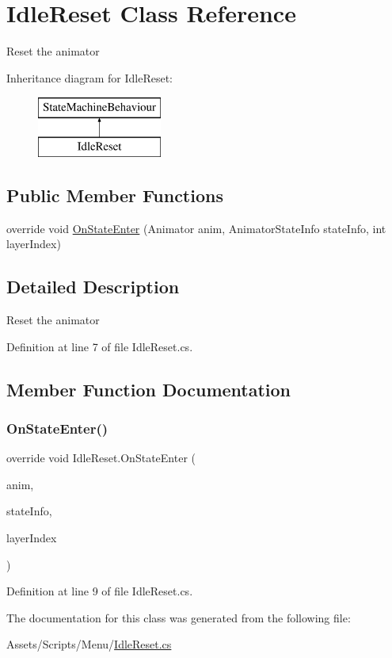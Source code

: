 \hypertarget{class_idle_reset}{}\section{Idle\+Reset Class Reference}
\label{class_idle_reset}


Reset the animator  


Inheritance diagram for Idle\+Reset\+:\begin{figure}[H]
\begin{center}
\leavevmode
\includegraphics[height=2.000000cm]{class_idle_reset}
\end{center}
\end{figure}
\subsection*{Public Member Functions}
\begin{DoxyCompactItemize}
\item 
override void \mbox{\hyperlink{class_idle_reset_a5b9eec21695e0ca71f9c5f86b4c715b4}{On\+State\+Enter}} (Animator anim, Animator\+State\+Info state\+Info, int layer\+Index)
\end{DoxyCompactItemize}


\subsection{Detailed Description}
Reset the animator 



Definition at line 7 of file Idle\+Reset.\+cs.



\subsection{Member Function Documentation}
\mbox{\label{class_idle_reset_a5b9eec21695e0ca71f9c5f86b4c715b4}} 
\subsubsection{\texorpdfstring{On\+State\+Enter()}{OnStateEnter()}}
{\footnotesize\ttfamily override void Idle\+Reset.\+On\+State\+Enter (\begin{DoxyParamCaption}\item[{Animator}]{anim,  }\item[{Animator\+State\+Info}]{state\+Info,  }\item[{int}]{layer\+Index }\end{DoxyParamCaption})}



Definition at line 9 of file Idle\+Reset.\+cs.



The documentation for this class was generated from the following file\+:\begin{DoxyCompactItemize}
\item 
Assets/\+Scripts/\+Menu/\mbox{\hyperlink{_idle_reset_8cs}{Idle\+Reset.\+cs}}\end{DoxyCompactItemize}
